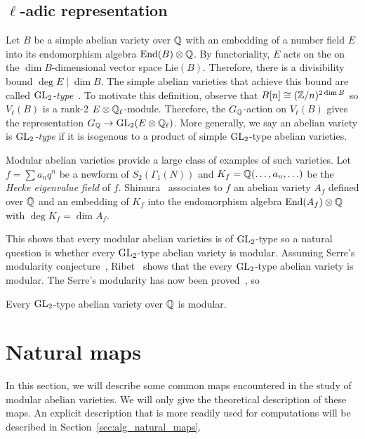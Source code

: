 \documentclass[11pt, proquest]{uwthesis}
\begin{document}
\subsection{$\ell$-adic representation}%
\label{sub:_ell_adic_representation}

Let $B$ be a simple abelian variety over $\mathbb{Q}$ with an embedding of a number
field $E$ into its endomorphism algebra $\operatorname{End}(B)\otimes \mathbb{Q}$. By functoriality,
$E$ acts on the on the $\dim B$-dimensional vector space $\mathrm{Lie}(B)$.
Therefore, there is a divisibility bound $\deg E\mid \dim B$. The simple
abelian varieties that achieve this bound are called
\emph{$\operatorname{GL}_2$-type}~\cite[\S 2]{ribet:abvars}. To motivate this definition,
observe that $B[n]\cong (\mathbb{Z}/n)^{2\dim B}$ so $V_\ell(B)$ is a rank-2 $E\otimes
\mathbb{Q}_\ell$-module. Therefore, the $G_{\mathbb{Q}}$-action on $V_\ell(B)$ gives the
representation $G_{\mathbb{Q}}\to \operatorname{GL}_2(E\otimes \mathbb{Q}_\ell)$. More generally, we say an
abelian variety is \emph{$\operatorname{GL}_2$-type} if it is isogenous to a product of
simple $\operatorname{GL}_2$-type abelian varieties.

Modular abelian varieties provide a large class of examples of such varieties.
Let $f=\sum a_n q^n$ be a newform of $S_2(\Gamma_1(N))$ and
$K_f=\mathbb{Q}(\ldots,a_n,\ldots)$ be the \emph{Hecke eigenvalue field} of $f$.
Shimura~\cite[Theorem 7.14]{shimura:intro} associates to $f$ an abelian variety
$A_f$ defined over $\mathbb{Q}$ and an embedding of $K_f$ into the endomorphism
algebra $\operatorname{End}(A_f)\otimes \mathbb{Q}$ with $\deg K_f = \dim A_f$.

This shows that every modular abelian varieties is of $\operatorname{GL}_2$-type so a natural
question is whether every $\operatorname{GL}_2$-type abelian variety is modular. Assuming Serre's
modularity conjecture~\cite[3.2.4]{serre:conjectures}, Ribet~\cite[Thm.
4.4]{ribet:abvars} shows that the every $\operatorname{GL}_2$-type abelian variety is
modular. The Serre's modularity has now been proved~\cite{}, so
\begin{theorem}
    Every $\operatorname{GL}_2$-type abelian variety over $\mathbb{Q}$ is modular.
\end{theorem}

\section{Natural maps}%
\label{sec:natural_maps}

In this section, we will describe some common maps encountered in the study of
modular abelian varieties. We will only give the theoretical description of
these maps. An explicit description that is more readily used for computations
will be described in Section~\ref{sec:alg_natural_maps}.
\end{document}
